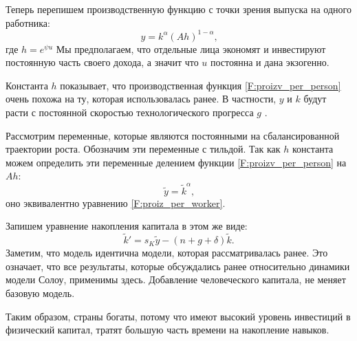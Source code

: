 Теперь перепишем производственную функцию с точки зрения выпуска на одного работника:
\begin{equation}
y = k^{\alpha}\left(Ah\right)^{1 - \alpha}\text{,}
\label{F:proizv_per_person}
\end{equation}
где $h=e^{\psi u}$
Мы предполагаем, что отдельные лица экономят и инвестируют постоянную часть своего дохода, а значит что $u$ постоянна и дана экзогенно.

Константа $h$ показывает, что производственная функция \ref{F:proizv_per_person} очень похожа на ту, которая использовалась ранее.
В частности, $y$ и $k$ будут расти с постоянной скоростью технологического прогресса $g$ .

Рассмотрим переменные, которые являются постоянными на сбалансированной траектории роста.
Обозначим эти переменные с тильдой.
Так как $h$ константа можем определить эти переменные делением функции \ref{F:proizv_per_person} на $Ah$:
\begin{equation}
\tilde{y} = \tilde{k}^{\alpha}\text{,}
\end{equation}
оно эквивалентно уравнению \ref{F:proiz_per_worker}.

Запишем уравнение накопления капитала в этом же виде:
\begin{equation*}
\tilde{k}' = s_{K} \tilde{y} - (n + g + \delta) \tilde{k}\text{.}
\end{equation*}
Заметим, что модель идентична модели, которая рассматривалась ранее.
Это означает, что все результаты, которые обсуждались ранее относительно динамики модели Солоу, применимы здесь.
Добавление человеческого капитала, не меняет базовую модель.

Таким образом, страны богаты, потому что имеют высокий уровень инвестиций в физический капитал, тратят большую часть времени на накопление навыков.

